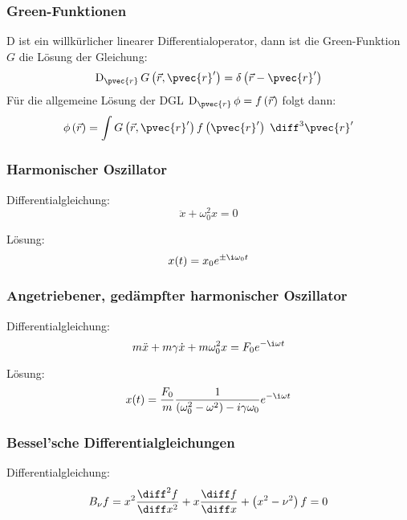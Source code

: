 \documentclass[11pt]{article}
\numberwithin{equation}{section}
\begin{document}
      \subsubsection{Green-Funktionen}
        $\mathrm{D}$ ist ein willkürlicher linearer Differentialoperator, dann ist die Green-Funktion $G$ die Lösung der Gleichung:
        \begin{equation}
          \mathrm{D}_{\pvec{r}}\, G\left(\vec{r},\pvec{r}'\right) = \delta\left(\vec{r} - \pvec{r}'\right)
        \end{equation}
        Für die allgemeine Lösung der DGL $\mathrm{D}_{\pvec{r}}\, \phi = f\left(\vec{r}\right)$ folgt dann:
        \begin{equation}
          \phi\left(\vec{r}\right) = \int G\left(\vec{r},\pvec{r}'\right)f\left(\pvec{r}'\right)\;\diff^3\pvec{r}'
        \end{equation}

      \subsubsection{Harmonischer Oszillator}
        Differentialgleichung:
        \begin{equation}
          \ddot{x}+\omega_0^2 x = 0
        \end{equation}

        Lösung:
        \begin{equation}
          x(t)=x_0 e^{\pm \i\omega_0 t}
        \end{equation}

      \subsubsection{Angetriebener, gedämpfter harmonischer Oszillator}
        Differentialgleichung:
        \begin{equation}
          m\ddot{x}+m\gamma\dot{x}+m\omega_0^2 x = F_0 e^{-\i\omega t}
        \end{equation}

        Lösung:
        \begin{equation}
          x(t) = \frac{F_0}{m} \frac{1}{\left(\omega_0^2-\omega^2\right)-i\gamma\omega_0} e^{-\i\omega t}
        \end{equation}

      \subsubsection{Bessel'sche Differentialgleichungen}
        Differentialgleichung:
        \begin{equation}
          B_\nu f = x^2\frac{\diff^2 f}{\diff x^2} + x\tder{f}{x}+\left(x^2-\nu^2\right)f = 0
        \end{equation}
\end{document}

